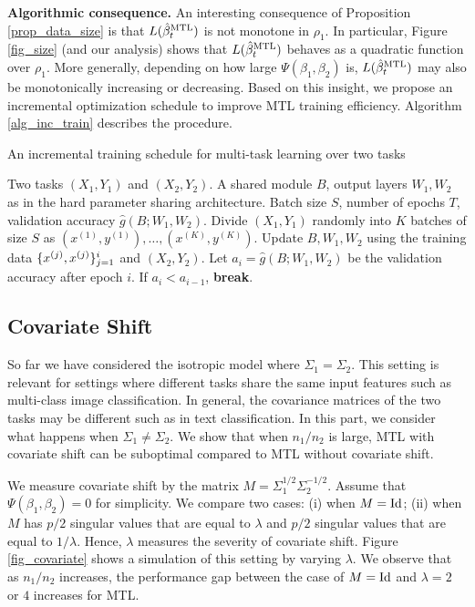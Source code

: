 \textbf{Algorithmic consequence.} An interesting consequence of Proposition \ref{prop_data_size} is that $L(\hat{\beta}_t^{\text{MTL}})$ is not monotone in $\rho_1$.
In particular, Figure \ref{fig_size} (and our analysis) shows that $L(\hat{\beta}_t^{\text{MTL}})$ behaves as a quadratic function over $\rho_1$.
More generally, depending on how large $\Psi(\beta_1, \beta_2)$ is, $L(\hat{\beta}_t^{\text{MTL}})$ may also be monotonically increasing or decreasing.
Based on this insight, we propose an incremental optimization schedule to improve MTL training efficiency.
Algorithm \ref{alg_inc_train} describes the procedure.

\begin{algorithm}[!t]
	\caption{An incremental training schedule for multi-task learning over two tasks}
	\label{alg_inc_train}
	\begin{algorithmic}[1]
		\Input Two tasks $(X_1, Y_1)$ and $(X_2, Y_2)$.
		\Param A shared module $B$, output layers $W_1, W_2$ as in the hard parameter sharing architecture.
		\Req Batch size $S$, number of epochs $T$, validation accuracy $\hat{g}(B; W_1, W_2)$.
		\State Divide $(X_1, Y_1)$ randomly into $K$ batches of size $S$ as $(x^{(1)}, y^{(1)}), \dots, (x^{(K)}, y^{(K)})$.
				\State Update $B, W_1, W_2$ using the training data $\{x^{(j)}, x^{(j)}\}_{j=1}^i$ and  $(X_2, Y_2)$.
			\EndFor
		\State Let $a_i = \hat{g}(B; W_1, W_2)$ be the validation accuracy after epoch $i$.
			If $a_i < a_{i-1}$, \textbf{break}.
		\EndFor
	\end{algorithmic}
\end{algorithm}

\subsection{Covariate Shift}

So far we have considered the isotropic model where $\Sigma_1 = \Sigma_2$.
This setting is relevant for settings where different tasks share the same input features such as multi-class image classification.
In general, the covariance matrices of the two tasks may be different such as in text classification.
In this part, we consider what happens when $\Sigma_1 \neq \Sigma_2$.
We show that when $n_1 / n_2$ is large, MTL with covariate shift can be suboptimal compared to MTL without covariate shift.

\begin{example}\label{ex_complement}
	We measure covariate shift by the matrix $M = \Sigma_1^{1/2} \Sigma_2^{-1/2}$.
	Assume that $\Psi(\beta_1, \beta_2) = 0$ for simplicity.
	We compare two cases: (i) when $M = \operatorname{Id}$; (ii) when $M$ has $p/2$ singular values that are equal to $\lambda$ and $p/2$ singular values that are equal to $1 / \lambda$.
	Hence, $\lambda$ measures the severity of covariate shift.
	Figure \ref{fig_covariate} shows a simulation of this setting by varying $\lambda$.
	We observe that as $n_1/n_2$ increases, the performance gap between the case of $M = \operatorname{Id}$ and $\lambda = 2$ or $4$ increases for MTL.
\end{example}

